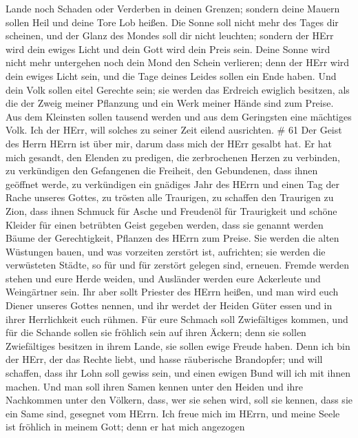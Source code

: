Lande noch Schaden oder Verderben in deinen Grenzen; sondern deine
Mauern sollen Heil und deine Tore Lob heißen.  Die Sonne
soll nicht mehr des Tages dir scheinen, und der Glanz des Mondes soll
dir nicht leuchten; sondern der HErr wird dein ewiges Licht und dein
Gott wird dein Preis sein.  Deine Sonne wird nicht mehr
untergehen noch dein Mond den Schein verlieren; denn der HErr wird dein
ewiges Licht sein, und die Tage deines Leides sollen ein Ende haben.
 Und dein Volk sollen eitel Gerechte sein; sie werden das
Erdreich ewiglich besitzen, als die der Zweig meiner Pflanzung und ein
Werk meiner Hände sind zum Preise.  Aus dem Kleinsten
sollen tausend werden und aus dem Geringsten eine mächtiges Volk. Ich
der HErr, will solches zu seiner Zeit eilend ausrichten. \# 61
 Der Geist des Herrn HErrn ist über mir, darum dass mich der
HErr gesalbt hat. Er hat mich gesandt, den Elenden zu predigen, die
zerbrochenen Herzen zu verbinden, zu verkündigen den Gefangenen die
Freiheit, den Gebundenen, dass ihnen geöffnet werde,  zu
verkündigen ein gnädiges Jahr des HErrn und einen Tag der Rache unseres
Gottes, zu trösten alle Traurigen,  zu schaffen den
Traurigen zu Zion, dass ihnen Schmuck für Asche und Freudenöl für
Traurigkeit und schöne Kleider für einen betrübten Geist gegeben werden,
dass sie genannt werden Bäume der Gerechtigkeit, Pflanzen des HErrn zum
Preise.  Sie werden die alten Wüstungen bauen, und was
vorzeiten zerstört ist, aufrichten; sie werden die verwüsteten Städte,
so für und für zerstört gelegen sind, erneuen.  Fremde
werden stehen und eure Herde weiden, und Ausländer werden eure
Ackerleute und Weingärtner sein.  Ihr aber sollt Priester
des HErrn heißen, und man wird euch Diener unseres Gottes nennen, und
ihr werdet der Heiden Güter essen und in ihrer Herrlichkeit euch rühmen.
 Für eure Schmach soll Zwiefältiges kommen, und für die
Schande sollen sie fröhlich sein auf ihren Äckern; denn sie sollen
Zwiefältiges besitzen in ihrem Lande, sie sollen ewige Freude haben.
 Denn ich bin der HErr, der das Rechte liebt, und hasse
räuberische Brandopfer; und will schaffen, dass ihr Lohn soll gewiss
sein, und einen ewigen Bund will ich mit ihnen machen.  Und
man soll ihren Samen kennen unter den Heiden und ihre Nachkommen unter
den Völkern, dass, wer sie sehen wird, soll sie kennen, dass sie ein
Same sind, gesegnet vom HErrn.  Ich freue mich im HErrn,
und meine Seele ist fröhlich in meinem Gott; denn er hat mich angezogen
